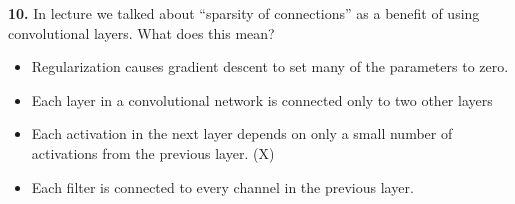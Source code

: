 \textbf{10.} In lecture we talked about “sparsity of connections” as a benefit of using convolutional layers. What does this mean?
\begin{itemize}
    \item Regularization causes gradient descent to set many of the parameters to zero.
    \item Each layer in a convolutional network is connected only to two other layers
    \item Each activation in the next layer depends on only a small number of activations from the previous layer. (X)
    \item Each filter is connected to every channel in the previous layer.
\end{itemize}